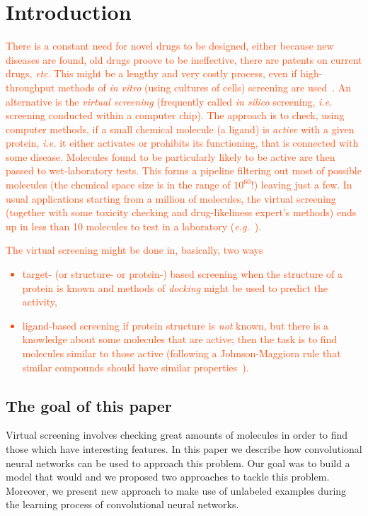 \documentclass[a4paper,10pt]{report}
\newcommand{\igor}[1]{\textcolor{OrangeRed}{#1}}
\begin{document}
  \chapter{Introduction}
      \igor{There is a constant need for novel drugs to be designed, either because new diseases are found, old drugs proove to be ineffective, there are patents on current drugs, \textit{etc}. This might be a lengthy and very costly process, even if high-throughput methods of \textit{in vitro} (using cultures of cells) screening are used~\cite{Breda2008}. An alternative is the \textit{virtual screening} (frequently called \textit{in silico} screening, \textit{i.e.} screening conducted within a computer chip). The approach is to check, using computer methods, if a small chemical molecule (a ligand) is \textit{active} with a given protein, \textit{i.e.} it either activates or prohibits its functioning, that is connected with some disease. Molecules found to be particularly likely to be active are then passed to wet-laboratory tests. This forms a pipeline filtering out most of possible molecules (the chemical space size is in the range of $10^{60}$!) leaving just a few. In usual applications starting from a million of molecules, the virtual screening (together with some toxicity checking and drug-likeliness expert's methods) ends up in less than 10 molecules to test in a laboratory (\textit{e.g.}~\cite{Pethukov2006}).
      }

      \igor{
	  The virtual screening might be done in, basically, two ways~\cite{Geppert2010,Varnek2012}
	  \begin{itemize}
      \item target- (or structure- or protein-) based screening when the structure of a protein is known and methods of \textit{docking} might be used to predict the activity,
      \item ligand-based screening if protein structure is \textit{not} known, but there is a knowledge about some molecules that are active; then the task is to find molecules similar to those active (following a Johnson-Maggiora rule that similar compounds should have similar properties~\cite{Varnek2012}).
      \end{itemize}
      }
  
    \section{The goal of this paper}
    
     Virtual screening involves checking great amounts of molecules in order to find those which have interesting features. In this paper we describe how convolutional neural networks can be used to approach this problem. Our goal was to build a model that would  and we proposed two approaches to tackle this problem. Moreover, we present new approach to make use of unlabeled examples during the learning process of convolutional neural networks.
    
\end{document}
